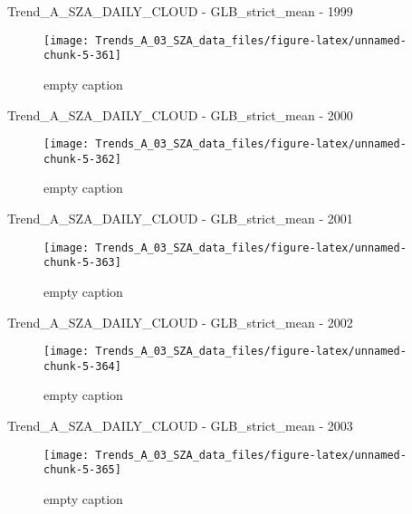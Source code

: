 \documentclass[
  10pt,
  a4paper,oneside]{article}
\begin{document}
Trend\_A\_SZA\_DAILY\_CLOUD - GLB\_strict\_mean - 1999

\begin{figure}[!ht]

{\centering \texttt{[image: Trends\_A\_03\_SZA\_data\_files/figure-latex/unnamed-chunk-5-361]} 

}

\caption{ empty caption }\label{fig:unnamed-chunk-5-361}
\end{figure}

Trend\_A\_SZA\_DAILY\_CLOUD - GLB\_strict\_mean - 2000

\begin{figure}[!ht]

{\centering \texttt{[image: Trends\_A\_03\_SZA\_data\_files/figure-latex/unnamed-chunk-5-362]} 

}

\caption{ empty caption }\label{fig:unnamed-chunk-5-362}
\end{figure}

Trend\_A\_SZA\_DAILY\_CLOUD - GLB\_strict\_mean - 2001

\begin{figure}[!ht]

{\centering \texttt{[image: Trends\_A\_03\_SZA\_data\_files/figure-latex/unnamed-chunk-5-363]} 

}

\caption{ empty caption }\label{fig:unnamed-chunk-5-363}
\end{figure}

Trend\_A\_SZA\_DAILY\_CLOUD - GLB\_strict\_mean - 2002

\begin{figure}[!ht]

{\centering \texttt{[image: Trends\_A\_03\_SZA\_data\_files/figure-latex/unnamed-chunk-5-364]} 

}

\caption{ empty caption }\label{fig:unnamed-chunk-5-364}
\end{figure}

Trend\_A\_SZA\_DAILY\_CLOUD - GLB\_strict\_mean - 2003

\begin{figure}[!ht]

{\centering \texttt{[image: Trends\_A\_03\_SZA\_data\_files/figure-latex/unnamed-chunk-5-365]} 

}

\caption{ empty caption }\label{fig:unnamed-chunk-5-365}
\end{figure}
\end{document}

